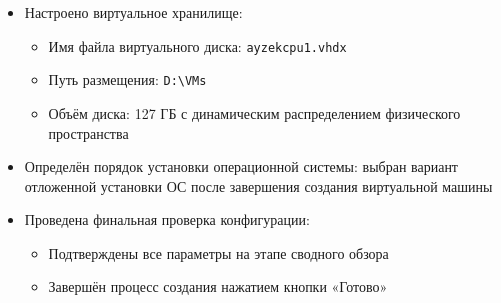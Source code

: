 \documentclass[areaset=advanced]{scrartcl}
\begin{document}
\begin{itemize}
\begin{itemize}
        \item Запланирована последующая замена на специализированный коммутатор \texttt{vmNat}
    \end{itemize}
    \item Настроено виртуальное хранилище:
    \begin{itemize}
        \item Имя файла виртуального диска: \texttt{ayzekcpu1.vhdx}
        \item Путь размещения: \texttt{D:\textbackslash VMs}
        \item Объём диска: 127 ГБ с динамическим распределением физического пространства
    \end{itemize}
    \item Определён порядок установки операционной системы: выбран вариант отложенной установки ОС после завершения создания виртуальной машины
    \item Проведена финальная проверка конфигурации:
    \begin{itemize}
        \item Подтверждены все параметры на этапе сводного обзора
        \item Завершён процесс создания нажатием кнопки «Готово»
    \end{itemize}
\end{itemize}
\end{document}
